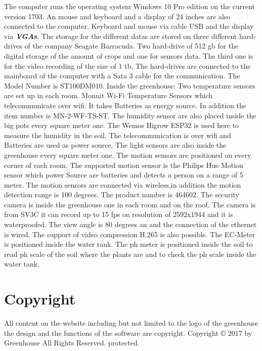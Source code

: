 The computer runs the operating system Windows 10 Pro edition on the current
version 1703. An mouse and keyboard and a display of 24 inches are also
connected to the computer. Keyboard and mouse via cable USB and the display via
\textbf{\emph{\glspl{VGA}}}. \newline
The storage for the different datas are stored on three different hard-drives of
the company Seagate Barracuda. Two hard-drive of 512 gb for the digital storage
of the amount of crops and one for sensors data. The third one is for the video
recording of the size of 1 tb. The hard-drives are connected to the mainboard of
the computer with a Sata 3 cable for the communication. The Model Number is
ST100DM010.\newline
Inside the greenhouse:\newline
Two temperature sensors are set up in each room. Monnit Wi-Fi Temperature
Sensors which telecommunicate over wifi. It takes Batteries as energy
source. In addition the item number is MN-2-WF-TS-ST.\newline
The humidity sensor are also placed inside the big pots every square meter one. 
The Wemos Higrow ESP32 is used here to measure the humidity in the soil. The
telecommunication is over wifi and Batteries are used as power source.\newline
The light sensors are also inside the greenhouse every square meter one.\newline
The motion sensors are positioned on every corner of each room. The supported
motion sensor is the Philips Hue Motion sensor which power Source are batteries
and detects a person on a range of 5 meter. The motion sensors are connected via
wireless,in addition the motion detection range is 100 degrees. The product
number is 464602.\newline
The security camera is inside the greenhouse one in each room and on the roof.
The camera is from SV3C it can record up to 15 fps on resolution of 2592x1944
and it is waterproofed. The view angle is 80 degrees an and the connection of
the ethernet is wired. The support of video compression H.265 is also
possible.\newline
The EC-Meter is positioned inside the water tank.\newline
The ph meter is positioned inside the soil to read ph scale of the soil where
the plants are and to check the ph scale inside the water tank.\newline



\section{Copyright}
All content on the website including but not limited to  the logo of the
greenhouse the design  and the functions of the software are copyright.
Copyright © 2017 by Greenhouse All Rights Reserved. protected.


